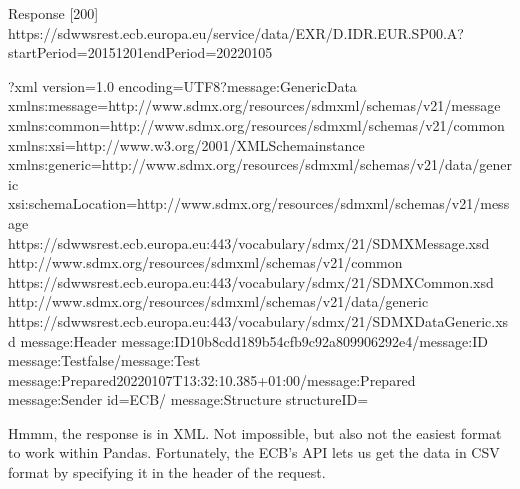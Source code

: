 \documentclass[letterpaper,10pt,english]{sphinxmanual}
\begin{document}
\begin{sphinxVerbatim}[commandchars=\\\{\}]
\PYGZlt{}Response [200]\PYGZgt{}
https://sdw\PYGZhy{}wsrest.ecb.europa.eu/service/data/EXR/D.IDR.EUR.SP00.A?startPeriod=2015\PYGZhy{}12\PYGZhy{}01\PYGZam{}endPeriod=2022\PYGZhy{}01\PYGZhy{}05
\end{sphinxVerbatim}

\begin{sphinxVerbatim}[commandchars=\\\{\}]
\PYGZlt{}?xml version=\PYGZdq{}1.0\PYGZdq{} encoding=\PYGZdq{}UTF\PYGZhy{}8\PYGZdq{}?\PYGZgt{}\PYGZlt{}message:GenericData xmlns:message=\PYGZdq{}http://www.sdmx.org/resources/sdmxml/schemas/v2\PYGZus{}1/message\PYGZdq{} xmlns:common=\PYGZdq{}http://www.sdmx.org/resources/sdmxml/schemas/v2\PYGZus{}1/common\PYGZdq{} xmlns:xsi=\PYGZdq{}http://www.w3.org/2001/XMLSchema\PYGZhy{}instance\PYGZdq{} xmlns:generic=\PYGZdq{}http://www.sdmx.org/resources/sdmxml/schemas/v2\PYGZus{}1/data/generic\PYGZdq{} xsi:schemaLocation=\PYGZdq{}http://www.sdmx.org/resources/sdmxml/schemas/v2\PYGZus{}1/message https://sdw\PYGZhy{}wsrest.ecb.europa.eu:443/vocabulary/sdmx/2\PYGZus{}1/SDMXMessage.xsd http://www.sdmx.org/resources/sdmxml/schemas/v2\PYGZus{}1/common https://sdw\PYGZhy{}wsrest.ecb.europa.eu:443/vocabulary/sdmx/2\PYGZus{}1/SDMXCommon.xsd http://www.sdmx.org/resources/sdmxml/schemas/v2\PYGZus{}1/data/generic https://sdw\PYGZhy{}wsrest.ecb.europa.eu:443/vocabulary/sdmx/2\PYGZus{}1/SDMXDataGeneric.xsd\PYGZdq{}\PYGZgt{}
\PYGZlt{}message:Header\PYGZgt{}
\PYGZlt{}message:ID\PYGZgt{}10b8cdd1\PYGZhy{}89b5\PYGZhy{}4cfb\PYGZhy{}9c92\PYGZhy{}a809906292e4\PYGZlt{}/message:ID\PYGZgt{}
\PYGZlt{}message:Test\PYGZgt{}false\PYGZlt{}/message:Test\PYGZgt{}
\PYGZlt{}message:Prepared\PYGZgt{}2022\PYGZhy{}01\PYGZhy{}07T13:32:10.385+01:00\PYGZlt{}/message:Prepared\PYGZgt{}
\PYGZlt{}message:Sender id=\PYGZdq{}ECB\PYGZdq{}/\PYGZgt{}
\PYGZlt{}message:Structure structureID=\PYGZdq{}
\end{sphinxVerbatim}

\sphinxAtStartPar
Hmmm, the response is in XML. Not impossible, but also not the easiest
format to work within Pandas. Fortunately, the ECB’s API lets us get the
data in CSV format by specifying it in the header of the request.
\end{document}
